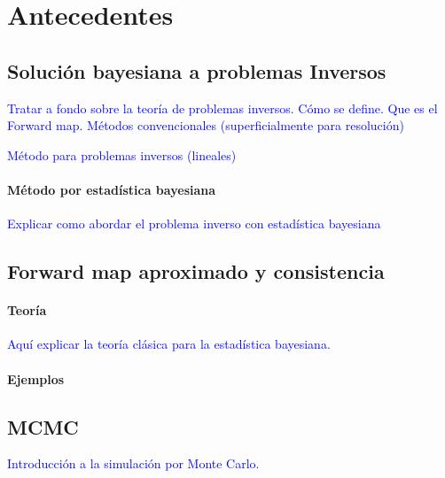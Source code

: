 
\chapter{Antecedentes}


\section{Solución bayesiana a  problemas Inversos}

\textcolor{blue}{Tratar a fondo sobre la teoría de problemas inversos. Cómo se define. Que es el Forward map. Métodos convencionales (superficialmente para resolución)}





\textcolor{blue}{
Método para problemas inversos (lineales)}

\subsubsection{Método por estadística bayesiana}
\textcolor{blue}{Explicar como abordar el problema inverso con estadística bayesiana}


\section{Forward map aproximado y consistencia}

\subsubsection{Teoría}
\textcolor{blue}{Aquí explicar la teoría clásica para la estadística bayesiana.}

\subsubsection{Ejemplos}


\section{MCMC}

\textcolor{blue}{Introducción a la simulación por Monte Carlo.}


